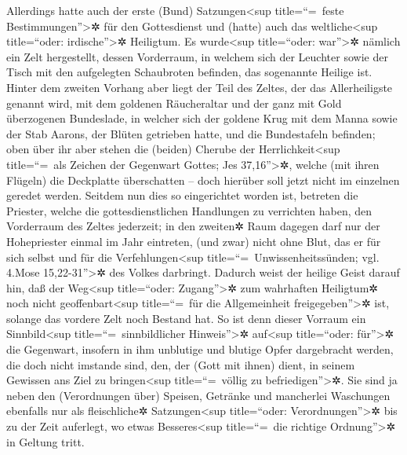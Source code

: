  Allerdings hatte auch der erste (Bund)
Satzungen\textless sup title=``=~feste Bestimmungen''\textgreater✲ für
den Gottesdienst und (hatte) auch das weltliche\textless sup
title=``oder: irdische''\textgreater✲ Heiligtum.  Es
wurde\textless sup title=``oder: war''\textgreater✲ nämlich ein Zelt
hergestellt, dessen Vorderraum, in welchem sich der Leuchter sowie der
Tisch mit den aufgelegten Schaubroten befinden, das sogenannte Heilige
ist.  Hinter dem zweiten Vorhang aber liegt der Teil des
Zeltes, der das Allerheiligste genannt wird,  mit dem
goldenen Räucheraltar und der ganz mit Gold überzogenen Bundeslade, in
welcher sich der goldene Krug mit dem Manna sowie der Stab Aarons, der
Blüten getrieben hatte, und die Bundestafeln befinden; 
oben über ihr aber stehen die (beiden) Cherube der
Herrlichkeit\textless sup title=``=~als Zeichen der Gegenwart Gottes;
Jes 37,16''\textgreater✲, welche (mit ihren Flügeln) die Deckplatte
überschatten -- doch hierüber soll jetzt nicht im einzelnen geredet
werden.  Seitdem nun dies so eingerichtet worden ist,
betreten die Priester, welche die gottesdienstlichen Handlungen zu
verrichten haben, den Vorderraum des Zeltes jederzeit;  in
den zweiten✲ Raum dagegen darf nur der Hohepriester einmal im Jahr
eintreten, (und zwar) nicht ohne Blut, das er für sich selbst und für
die Verfehlungen\textless sup title=``=~Unwissenheitssünden; vgl. 4.Mose
15,22-31''\textgreater✲ des Volkes darbringt.  Dadurch
weist der heilige Geist darauf hin, daß der Weg\textless sup
title=``oder: Zugang''\textgreater✲ zum wahrhaften Heiligtum✲ noch nicht
geoffenbart\textless sup title=``=~für die Allgemeinheit
freigegeben''\textgreater✲ ist, solange das vordere Zelt noch Bestand
hat.  So ist denn dieser Vorraum ein Sinnbild\textless sup
title=``=~sinnbildlicher Hinweis''\textgreater✲ auf\textless sup
title=``oder: für''\textgreater✲ die Gegenwart, insofern in ihm
unblutige und blutige Opfer dargebracht werden, die doch nicht imstande
sind, den, der (Gott mit ihnen) dient, in seinem Gewissen ans Ziel zu
bringen\textless sup title=``=~völlig zu befriedigen''\textgreater✲.
 Sie sind ja neben den (Verordnungen über) Speisen,
Getränke und mancherlei Waschungen ebenfalls nur als fleischliche✲
Satzungen\textless sup title=``oder: Verordnungen''\textgreater✲ bis zu
der Zeit auferlegt, wo etwas Besseres\textless sup title=``=~die
richtige Ordnung''\textgreater✲ in Geltung tritt.

